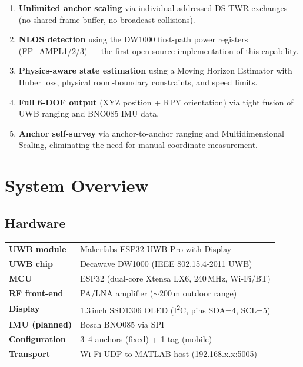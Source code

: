 \documentclass[11pt,a4paper]{article}
\begin{document}
\begin{enumerate}[leftmargin=2em]
  \item \textbf{Unlimited anchor scaling} via individual addressed DS-TWR exchanges (no shared frame buffer, no broadcast collisions).
  \item \textbf{NLOS detection} using the DW1000 first-path power registers (FP\_AMPL1/2/3) --- the first open-source implementation of this capability.
  \item \textbf{Physics-aware state estimation} using a Moving Horizon Estimator with Huber loss, physical room-boundary constraints, and speed limits.
  \item \textbf{Full 6-DOF output} (XYZ position + RPY orientation) via tight fusion of UWB ranging and BNO085 IMU data.
  \item \textbf{Anchor self-survey} via anchor-to-anchor ranging and Multidimensional Scaling, eliminating the need for manual coordinate measurement.
\end{enumerate}

\section{System Overview}

\subsection{Hardware}

\begin{keybox}
\begin{tabular}{ll}
  \textbf{UWB module} & Makerfabs ESP32 UWB Pro with Display \\
  \textbf{UWB chip}   & Decawave DW1000 (IEEE 802.15.4-2011 UWB) \\
  \textbf{MCU}        & ESP32 (dual-core Xtensa LX6, 240\,MHz, Wi-Fi/BT) \\
  \textbf{RF front-end} & PA/LNA amplifier ($\sim$200\,m outdoor range) \\
  \textbf{Display}    & 1.3\,inch SSD1306 OLED (I\textsuperscript{2}C, pins SDA=4, SCL=5) \\
  \textbf{IMU (planned)} & Bosch BNO085 via SPI \\
  \textbf{Configuration} & 3--4 anchors (fixed) + 1 tag (mobile) \\
  \textbf{Transport}  & Wi-Fi UDP to MATLAB host (192.168.x.x:5005) \\
\end{tabular}
\end{keybox}
\end{document}
